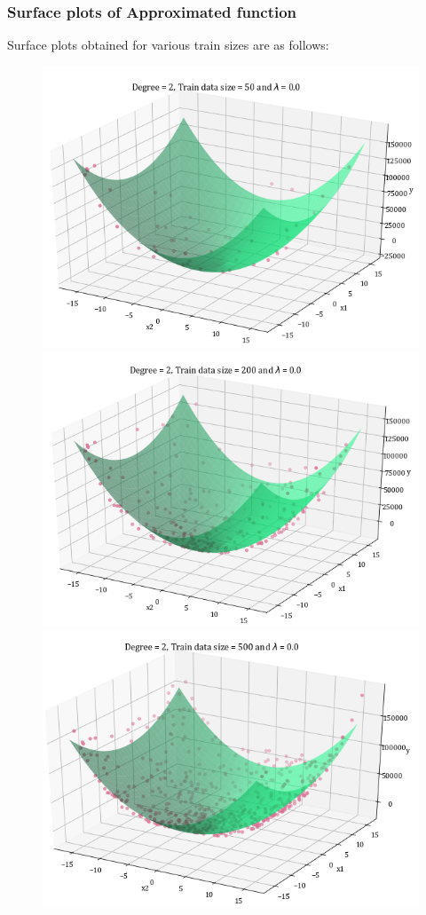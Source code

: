 \documentclass[12pt,a4paper]{article}
\begin{document}
\subsubsection{Surface plots of Approximated function}
Surface plots obtained for various train sizes are as follows: 
\begin{figure}[H]
    \centering
    \includegraphics[scale=0.6]{images/D=2,T=50,l=0.0.png}
    \hspace{2em}
    \includegraphics[scale=0.6]{images/D=2,T=200,l=0.0.png}
    \includegraphics[scale=0.6]{images/D=2,T=500,l=0.0.png}

\end{figure}
\end{document}
